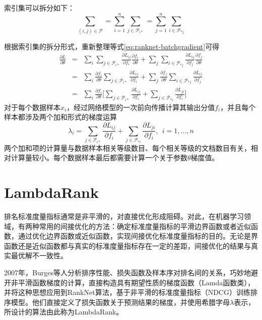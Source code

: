 索引集可以拆分如下：
\begin{equation}
    \sum\limits_{(i,j)\in \mathscr P} = \sum\limits_{i=1}^n \sum\limits_{j\in \mathscr P_{i*}} = \sum\limits_{j=1}^n \sum\limits_{i\in \mathscr P_{*j}}
\end{equation}

根据索引集的拆分形式，重新整理等式\eqref{eq:ranknet-batchgradient}可得
\begin{equation}
    \begin{array}{lll}
     \frac{\partial L}{\partial \theta} & = & \sum\limits_i \sum\limits_{j\in \mathscr P_{i*}} \frac{\partial L_{ij}}{\partial f_i} \frac{\partial f_i}{\partial \theta} + \sum\limits_j \sum\limits_{i\in \mathscr P_{*j}} \frac{\partial L_{ij}}{\partial f_j}\frac{\partial f_j}{\partial \theta} \\
     & = & \sum\limits_i \frac{\partial f_i}{\partial \theta} \sum\limits_{j\in \mathscr P_{i*}} \frac{\partial L_{ij}}{\partial f_i} + \sum\limits_j \frac{\partial f_j}{\partial \theta}  \sum\limits_{i\in \mathscr P_{*j}} \frac{\partial L_{ij}}{\partial f_j} \\
     & = & \sum\limits_i \frac{\partial f_i}{\partial \theta} \big[\sum\limits_{j\in \mathscr P_{i*}} \frac{\partial L_{ij}}{\partial f_i} + \sum\limits_{j\in \mathscr P_{*i}} \frac{\partial L_{ji}}{\partial f_i}\big]
    \end{array}
\end{equation}
对于每个数据样本$x_i$，经过网络模型的一次前向传播计算其输出分值$f_i$，并且每个样本都涉及两个加和形式的梯度运算
\begin{equation}
    \lambda_i = \sum\limits_{j\in \mathscr P_{i*}} \frac{\partial L_{ij}}{\partial f_i} + \sum\limits_{j\in \mathscr P_{*i}} \frac{\partial L_{ji}}{\partial f_i},~~i=1,\ldots,n
\end{equation}
两个加和项的计算量与数据样本相关等级数目、每个相关等级的文档数目有关，相对计算量较小。每个数据样本最后都需要计算一个关于参数$\theta$梯度值。

\section{LambdaRank}
排名标准度量指标通常是非平滑的，对直接优化形成阻碍。对此，在机器学习领域，有两种常用的间接优化的方法：确定标准度量指标的平滑边界函数或者近似函数，通过优化边界函数或近似函数，实现间接优化标准度量指标的目的。无论是界函数还是近似函数都与真实的标准度量指标存在一定的差距，间接优化的结果与真实最优解不一致性。

2007年，Burges等人\cite{burges2007learning}分析排序性能、损失函数及样本序对排名间的关系，巧妙地避开非平滑函数梯度的计算，直接构造具有期望性质的梯度函数（Lamda函数类），并将这种思想应用到RankNet算法，基于非平滑的标准度量指标（NDCG）训练排序模型。他们直接定义了损失函数关于预测结果的梯度，并使用希腊字母$\lambda$表示，所设计的算法由此称为LambdaRank。

